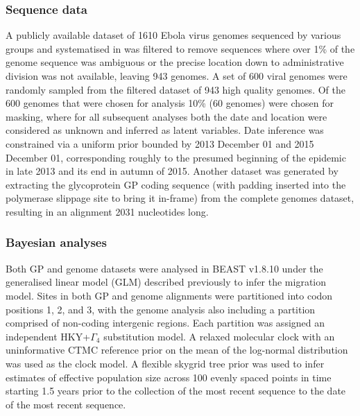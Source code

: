 \documentclass[11pt,oneside,letterpaper]{article}
\begin{document}
\subsubsection*{Sequence data}
A publicly available dataset of 1610 Ebola virus genomes sequenced by various groups \citep{baize_emergence_2014,gire_genomic_2014,park_ebola_2015,carroll_temporal_2015,kugelman_monitoring_2015,ladner_evolution_2015,simon-loriere_distinct_2015,tong_genetic_2015,arias_rapid_2016,smits_genotypic_2015,quick_rapid_2015} and systematised in \cite{dudas_virus_2017} was filtered to remove sequences where over 1\% of the genome sequence was ambiguous or the precise location down to administrative division was not available, leaving 943 genomes.
A set of 600 viral genomes were randomly sampled from the filtered dataset of 943 high quality genomes.
Of the 600 genomes that were chosen for analysis 10\% (60 genomes) were chosen for masking, where for all subsequent analyses both the date and location were considered as unknown and inferred as latent variables.
Date inference was constrained via a uniform prior bounded by 2013 December 01 and 2015 December 01, corresponding roughly to the presumed beginning of the epidemic in late 2013 and its end in autumn of 2015.
Another dataset was generated by extracting the glycoprotein GP coding sequence (with padding inserted into the polymerase slippage site to bring it in-frame) from the complete genomes dataset, resulting in an alignment 2031 nucleotides long.

\subsubsection*{Bayesian analyses}
Both GP and genome datasets were analysed in BEAST v1.8.10 \citep{suchard_bayesian_2018} under the generalised linear model (GLM) described previously \citep{faria_simultaneously_2013,lemey_unifying_2014,dudas_virus_2017} to infer the migration model.
Sites in both GP and genome alignments were partitioned into codon positions 1, 2, and 3, with the genome analysis also including a partition comprised of non-coding intergenic regions.
Each partition was assigned an independent HKY+$\Gamma_{4}$ \citep{hky_1985,yang_1994} substitution model.
A relaxed molecular clock \citep{drummond_2006} with an uninformative CTMC reference prior on the mean \citep{ferreira_bayesian_nodate} of the log-normal distribution was used as the clock model.
A flexible skygrid tree prior \citep{gill_2013} was used to infer estimates of effective population size across 100 evenly spaced points in time starting 1.5 years prior to the collection of the most recent sequence to the date of the most recent sequence.
\end{document}
